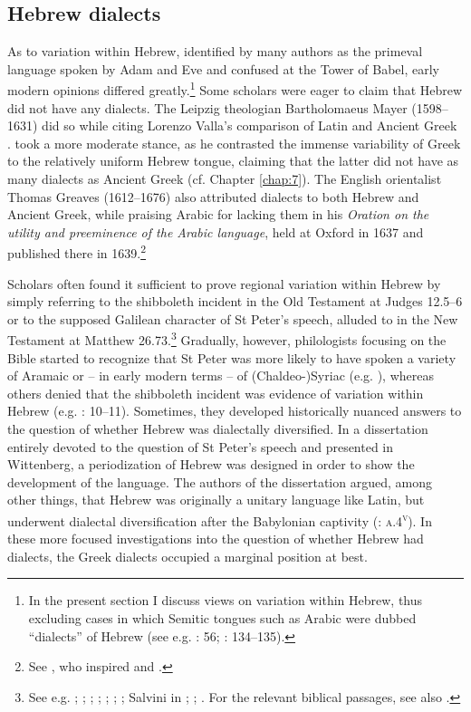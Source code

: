 \subsection{Hebrew dialects}

As to variation within Hebrew, identified by many authors as the primeval language spoken by Adam and Eve and confused at the Tower of Babel, early modern opinions differed greatly.\footnote{In the present section I discuss views on variation within Hebrew, thus excluding cases in which Semitic tongues such as Arabic were dubbed “dialects” of Hebrew (see e.g. \citealt{Bochart1646}: 56; \citealt{Martin1737}: 134–135).} Some scholars were eager to claim that Hebrew did not have any dialects. The Leipzig theologian Bartholomaeus Mayer (1598–1631) did so while citing Lorenzo Valla’s comparison of Latin and Ancient Greek \citep[10]{Mayer1629}. \citet[\textsc{b.3}\textsc{\textsuperscript{v}}]{Junius1579} took a more moderate stance, as he contrasted the immense variability of Greek to the relatively uniform Hebrew tongue, claiming that the latter did not have as many dialects as Ancient Greek (cf. Chapter \ref{chap:7}). The English orientalist Thomas Greaves (1612–1676) also attributed dialects to both Hebrew and Ancient Greek, while praising Arabic for lacking them in his \textit{Oration on the utility and preeminence of the Arabic language}, held at Oxford in 1637 and published there in 1639.\footnote{See \citet[19--20]{Greaves1639}, who inspired \citet[60]{Leigh1656} and \citet[73]{Blount1680}.}

Scholars often found it sufficient to prove regional variation within Hebrew by simply referring to the shibboleth incident in the Old Testament at Judges 12.5–6 or to the supposed Galilean character of St Peter’s speech, alluded to in the New Testament at Matthew 26.73.\footnote{See e.g. \citet[6]{Bovelles1533}; \citet[\textsc{b.3}\textsc{\textsuperscript{v}}]{Bachmann1625}; \citet[102]{Weemes1632}; \citet[2]{Wyss1650}; \citet[18]{Walton1657}; \citet[180]{Webb1669}; \citet[6]{Kiesling1712}; Salvini in \citet[103]{Muratori1724}; \citet[30]{Hauptmann1751}; \citet[13--14]{Hof1772}. For the relevant biblical passages, see also \citet[199--200]{VanRooy2018b}.} Gradually, however, philologists focusing on the Bible started to recognize that St Peter was more likely to have spoken a variety of Aramaic or – in early modern terms – of (Chaldeo-)Syriac (e.g. \citealt{Pfeiffer1663}), whereas others denied that the shibboleth incident was evidence of variation within Hebrew (e.g. \citealt{Mayer1629}: 10–11). Sometimes, they developed historically nuanced answers to the question of whether Hebrew was dialectally diversified. In a dissertation entirely devoted to the question of St Peter’s speech and presented in Wittenberg, a periodization of Hebrew was designed in order to show the development of the language. The authors of the dissertation argued, among other things, that Hebrew was originally a unitary language like Latin, but underwent dialectal diversification after the Babylonian captivity (\citealt{Pfeiffer1663}: \textsc{a.4}\textsc{\textsuperscript{v}}). In these more focused investigations into the question of whether Hebrew had dialects, the Greek dialects occupied a marginal position at best.

